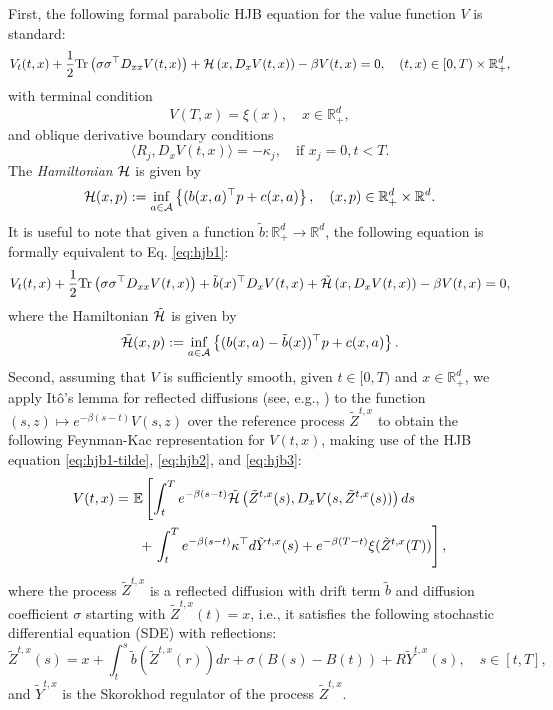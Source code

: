 \documentclass[11pt]{article}
\theoremstyle{definition}
\theoremstyle{plain}
\newcommand{\R}{\mathbb{R}}
\newcommand{\cH}{{\cal H}}
\newcommand{\tb}{\tilde{b}}
\begin{document}
First, the following formal parabolic HJB equation for the value function $V$ is standard:
\begin{equation}\label{eq:hjb1}
V_t(t,x) + \frac{1}{2}\mathrm{Tr}\left(\sigma\sigma^{\top} D_{xx}V(t,x)\right) + \cH\left(x, D_x V(t,x)\right) - \beta V(t,x) = 0, 
\quad (t,x) \in [0,T) \times \mathbb{R}^d_+,
\end{equation}
with terminal condition
\begin{equation}\label{eq:hjb2}
V(T,x) = \xi(x), \quad x \in \mathbb{R}^d_+, 
\end{equation}
and oblique derivative boundary conditions 
\begin{equation}\label{eq:hjb3}
\langle R_j, D_x V (t,x) \rangle = -\kappa_j, \quad \text{if } x_j = 0, t<T.
\end{equation}
The {\em Hamiltonian} $\cH$ is given by  
\begin{equation}\label{eq:hamiltonian}
\cH(x,p) := \inf_{a \in \mathcal{A}} \left\{ (b(x,a)^{\top} p + c(x,a) \right\}, \quad (x,p) \in \mathbb{R}^d_+ \times \mathbb{R}^d.
\end{equation}
It is useful to note that given a function $\tb : \R_+^d \to \R^d$, the following equation is formally equivalent to Eq. \eqref{eq:hjb1}:
\begin{equation}\label{eq:hjb1-tilde}
    V_t(t,x) + \frac{1}{2}\mathrm{Tr}\left(\sigma\sigma^{\top} D_{xx}V(t,x)\right) + \tb(x)^{\top} D_x V(t,x) + \tilde\cH\left(x, D_x V(t,x)\right) - \beta V(t,x) = 0, 
\end{equation}
where the Hamiltonian $\tilde\cH$ is given by
\begin{equation}\label{eq:hamiltonian-tilde}
    \tilde \cH(x,p) := \inf_{a \in \mathcal{A}} \left\{ (b(x,a) - \tb(x))^{\top} p + c(x,a) \right\}.
\end{equation}
Second, assuming that $V$ is sufficiently smooth, given $t \in [0,T)$ and $x \in \mathbb{R}^d_+$, we apply Itô's lemma for reflected diffusions (see, e.g., \cite{HarrisonReiman81}) 
to the function $(s,z) \mapsto e^{-\beta (s-t)} V(s, z)$ 
over the reference process $\tilde Z^{t,x}$ to obtain the following Feynman-Kac representation for $V(t,x)$, making use of 
the HJB equation \eqref{eq:hjb1-tilde}, \eqref{eq:hjb2}, and \eqref{eq:hjb3}:
\begin{align}
    V(t,x) = &~\mathbb{E} \left[ \int_t^T e^{-\beta(s-t)} \tilde\cH\left(\tilde Z^{t,x}(s), D_x V(s, \tilde Z^{t,x}(s))\right) ds \right. \nonumber \\
    &~~+ \left.\int_t^T e^{-\beta(s-t)} \kappa^{\top} d \tilde Y^{t,x}(s) + e^{-\beta(T-t)}\xi(\tilde{Z}^{t,x}(T)) \right],
    \label{eq:feynman-kac-tilde}
\end{align}
where the process $\tilde Z^{t,x}$ is a reflected diffusion with drift term $\tb$ and diffusion coefficient $\sigma$ starting with $\tilde Z^{t,x}(t)=x$, 
i.e., it satisfies the following stochastic differential equation (SDE) with reflections:
\begin{equation}\label{eq:Z-t-x}
    \tilde{Z}^{t,x}(s) = x + \int_t^s \tb(\tilde{Z}^{t,x}(r)) dr + \sigma (B(s) - B(t)) + R \tilde{Y}^{t,x}(s), \quad s \in [t,T],
\end{equation}
and $\tilde Y^{t,x}$ is the Skorokhod regulator of the process $\tilde Z^{t,x}$. 
\end{document}
